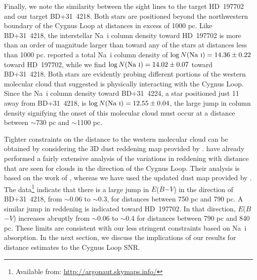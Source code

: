 \documentclass[fleqn,usenatbib]{mnras}
\begin{document}
Finally, we note the similarity between the sight lines to the \citet{w02} target HD~197702 and our target BD+31~4218. Both stars are positioned beyond the northwestern boundary of the Cygnus Loop at distances in excess of 1000 pc. Like BD+31~4218, the interstellar Na~{\sc i} column density toward HD~197702 is more than an order of magnitude larger than toward any of the stars at distances less than 1000 pc. \citet{w02} reported a total Na~{\sc i} column density of $\log N({\rm Na~\textsc{i}})=14.36\pm0.22$ toward HD~197702, while we find $\log N({\rm Na~\textsc{i}})=14.02\pm0.07$ toward BD+31~4218. Both stars are evidently probing different portions of the western molecular cloud that \citet{f18b} suggested is physically interacting with the Cygnus Loop. Since the Na~{\sc i} column density toward BD+31~4224, a star positioned just 11 away from BD+31~4218, is $\log N({\rm Na~\textsc{i}})=12.55\pm0.04$, the large jump in column density signifying the onset of this molecular cloud must occur at a distance between $\sim$730 pc and $\sim$1100 pc.

Tighter constraints on the distance to the western molecular cloud can be obtained by considering the 3D dust reddening map provided by \citet{g19}. \citet{f18a,f18b} have already performed a fairly extensive analysis of the variations in reddening with distance that are seen for clouds in the direction of the Cygnus Loop. Their analysis is based on the work of \citet{g15}, whereas we have used the updated dust map provided by \citet{g19}. The \citet{g19} data\footnote{Available from: \url{http://argonaut.skymaps.info/}} indicate that there is a large jump in $E$($B$$-$$V$) in the direction of BD+31~4218, from $\sim$0.06 to $\sim$0.3, for distances between 750 pc and 790 pc. A similar jump in reddening is indicated toward HD~197702. In that direction, $E$($B$$-$$V$) increases abruptly from $\sim$0.06 to $\sim$0.4 for distances between 790 pc and 840 pc. These limits are consistent with our less stringent constraints based on Na~{\sc i} absorption. In the next section, we discuss the implications of our results for distance estimates to the Cygnus Loop SNR.
\end{document}
